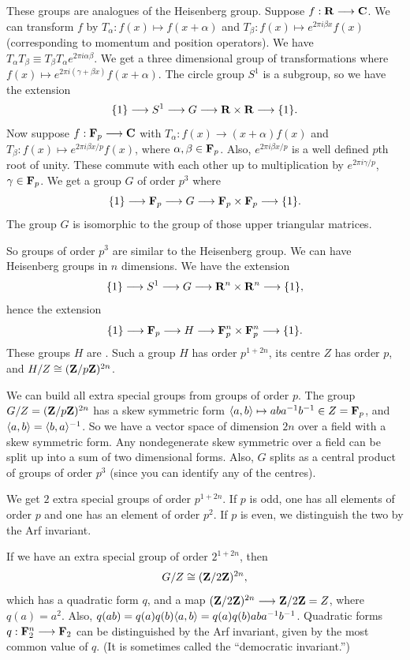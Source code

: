 \documentclass[11pt, twoside]{amsart}
\begin{document}
These groups are analogues of the Heisenberg group. Suppose $f:\mathbf R\longrightarrow\mathbf C$. We can transform $f$ by $T_\alpha : f(x)\mapsto f(x+\alpha)$ and $T_\beta : f(x) \mapsto e^{2\pi i \beta x}f(x)$ (corresponding to momentum and position operators). We have $T_\alpha T_\beta \equiv T_\beta T_\alpha e^{2\pi i \alpha \beta}$. We get a three dimensional group of transformations where $f(x) \mapsto e^{2\pi i (\gamma + \beta x)} f(x+\alpha) $. The circle group $S^1$ is a subgroup, so we have the extension
$$
\{1 \} \longrightarrow S^1 \longrightarrow G \longrightarrow \mathbf R\times \mathbf R \longrightarrow \{1\}.
$$
Now suppose $f: \mathbf F_p \longrightarrow \mathbf C$ with $T_\alpha : f(x) \longrightarrow (x+\alpha)f(x)$ and $T_\beta : f(x) \mapsto e^{2\pi i \beta x/p} f(x)$, where $\alpha,\beta\in \mathbf F_p$. Also, $e^{2\pi i\beta x/p}$ is a well defined $p$th root of unity. These commute with each other up to multiplication by $e^{2\pi i \gamma/p}$, $\gamma\in \mathbf F_p$. We get a group $G$ of order $p^3$ where
$$
\{1\} \longrightarrow \mathbf F_p \longrightarrow G \longrightarrow \mathbf F_p\times \mathbf F_p\longrightarrow\{1\}.
$$
The group $G$ is isomorphic to the group of those upper triangular matrices. 

So groups of order $p^3$ are similar to the Heisenberg group. We can have Heisenberg groups in $n$ dimensions. We have the extension
$$
\{1\} \longrightarrow S^1 \longrightarrow G \longrightarrow \mathbf R^n \times \mathbf R^n \longrightarrow \{1\},
$$
hence the extension
$$
\{1\} \longrightarrow \mathbf F_p \longrightarrow H \longrightarrow \mathbf F_p^n \times \mathbf F_p^n \longrightarrow \{1\}.
$$
These groups $H$ are . Such a group $H$ has order $p^{1+2n}$, its centre $Z$ has order $p$, and $H/Z \cong (\mathbf{Z}/p\mathbf{Z})^{2n}$.

We can build all extra special groups from groups of order $p$. The group $G/Z=(\mathbf{Z}/p\mathbf{Z})^{2n}$ has a skew symmetric form $\langle a,b\rangle \mapsto aba^{-1} b^{-1}\in Z = \mathbf F_p$, and $\langle a,b\rangle =\langle b,a\rangle ^{-1}$. So we have a vector space of dimension $2n$ over a field with a skew symmetric form. Any nondegenerate skew symmetric over a field can be split up into a sum of two dimensional forms. Also, $G$ splits as a central product of groups of order $p^3$ (since you can identify any of the centres). 

We get $2$ extra special groups of order $p^{1+2n}$. If $p$ is odd, one has all elements of order $p$ and one has an element of order $p^2$. If $p$ is even, we distinguish the two by the Arf invariant.

If we have an extra special group of order $2^{1+2n}$, then 
$$
G/Z \cong (\mathbf{Z}/2\mathbf{Z} )^{2n},
$$
which has a quadratic form $q$, and a map $(\mathbf{Z}/2\mathbf{Z} )^{2n} \longrightarrow \mathbf{Z}/2\mathbf{Z}  = Z$, where $q(a) = a^2$. Also, $q(ab) = q(a)q(b)\langle a,b\rangle = q(a)q(b)aba^{-1} b^{-1}$. Quadratic forms $q : \mathbf F_2^n \longrightarrow \mathbf F_2$ can be distinguished by the Arf invariant, given by the most common value of $q$. (It is sometimes called the ``democratic invariant.'')
\end{document}
